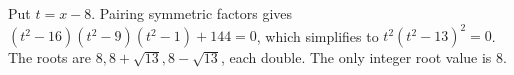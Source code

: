 Put $t=x-8$. Pairing symmetric factors gives $(t^2-16)(t^2-9)(t^2-1)+144=0$, which simplifies to $t^2(t^2-13)^2=0$. The roots are $8,8+\sqrt{13},8-\sqrt{13}$, each double. The only integer root value is $\boxed8$.
